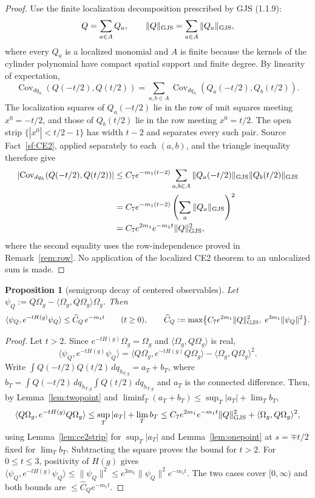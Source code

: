 \documentclass[11pt,a4paper]{article}
\theoremstyle{plain}
\newtheorem{proposition}[theorem]{Proposition}
\theoremstyle{definition}
\theoremstyle{plain}
\theoremstyle{definition}
\newcommand{\Om}{\Omega}
\newcommand{\ip}[2]{\langle #1,#2\rangle}
\begin{document}
\begin{proof}
Use the finite localization decomposition prescribed by GJS (1.1.9):
\[
 Q=\sum_{a\in A}Q_a,
 \qquad
 \|Q\|_{\rm GJS}=\sum_{a\in A}\|Q_a\|_{\rm GJS},
\]
where every $Q_a$ is a localized monomial and $A$ is finite because the kernels
of the cylinder polynomial have compact spatial support and finite degree.  By
linearity of expectation,
\[
 \operatorname{Cov}_{dq_h}(Q(-t/2),Q(t/2))
 =\sum_{a,b\in A}
   \operatorname{Cov}_{dq_h}(Q_a(-t/2),Q_b(t/2)).
\]
The localization squares of $Q_a(-t/2)$ lie in the row of unit squares meeting
$x^0=-t/2$, and those of $Q_b(t/2)$ lie in the row meeting $x^0=t/2$.
The open strip $\{|x^0|<t/2-1\}$ has width $t-2$ and separates every such pair.
Source Fact~\ref{sf:CE2}, applied separately to each $(a,b)$, and the triangle
inequality therefore give
\begin{align*}
 \left|\operatorname{Cov}_{dq_h}(Q(-t/2),Q(t/2))\right|
 &\le C_7e^{-m_1(t-2)}
   \sum_{a,b\in A}\|Q_a(-t/2)\|_{\rm GJS}
                    \|Q_b(t/2)\|_{\rm GJS}\\
 &=C_7e^{-m_1(t-2)}
   \left(\sum_a\|Q_a\|_{\rm GJS}\right)^2\\
 &=C_7e^{2m_1}e^{-m_1t}\|Q\|_{\rm GJS}^2,
\end{align*}
where the second equality uses the row-independence proved in
Remark~\ref{rem:row}.  No application of the localized CE2 theorem to an
unlocalized sum is made.
\end{proof}

\begin{proposition}[semigroup decay of centered observables]\label{prop:semidecay}
Let $\psi_Q:=Q\Om_g-\ip{\Om_g}{Q\Om_g}\Om_g$. Then
\[
 \ip{\psi_Q}{e^{-tH(g)}\psi_Q}\le\widehat C_Q\,e^{-m_1t}\qquad(t\ge0),
 \qquad
 \widehat C_Q:=\max\bigl\{C_7e^{2m_1}\|Q\|_{\rm GJS}^2,\;e^{3m_1}\|\psi_Q\|^2\bigr\} .
\]
\end{proposition}

\begin{proof}
Let $t>2$. Since $e^{-tH(g)}\Om_g=\Om_g$ and
$\ip{\Om_g}{Q\Om_g}$ is real,
\[
 \ip{\psi_Q}{e^{-tH(g)}\psi_Q}
 =\ip{Q\Om_g}{e^{-tH(g)}Q\Om_g}-\ip{\Om_g}{Q\Om_g}^2 .
\]
Write $\int Q(-t/2)Q(t/2)\,dq_{h_{T,g}}=a_T+b_T$, where
$b_T=\int Q(-t/2)\,dq_{h_{T,g}}\int Q(t/2)\,dq_{h_{T,g}}$ and $a_T$ is the connected
difference. Then, by Lemma~\ref{lem:twopoint} and
$\liminf_T(a_T+b_T)\le\sup_T|a_T|+\lim_Tb_T$,
\[
 \ip{Q\Om_g}{e^{-tH(g)}Q\Om_g}
 \le\sup_T|a_T|+\lim_Tb_T
 \le C_7e^{2m_1}e^{-m_1t}\|Q\|_{\rm GJS}^2+\ip{\Om_g}{Q\Om_g}^2 ,
\]
using Lemma~\ref{lem:ce2strip} for $\sup_T|a_T|$ and Lemma~\ref{lem:onepoint} at
$s=\mp t/2$ fixed for $\lim_Tb_T$. Subtracting the square proves the bound for $t>2$. For
$0\le t\le3$, positivity of $H(g)$ gives
$\ip{\psi_Q}{e^{-tH(g)}\psi_Q}\le\|\psi_Q\|^2\le e^{3m_1}\|\psi_Q\|^2e^{-m_1t}$. The two
cases cover $[0,\infty)$ and both bounds are $\le\widehat C_Qe^{-m_1t}$.
\end{proof}
\end{document}
